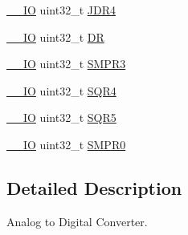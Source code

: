 \begin{DoxyCompactItemize}
\item 
\hyperlink{group___c_m_s_i_s__core__definitions_gaec43007d9998a0a0e01faede4133d6be}{\-\_\-\-\_\-\-I\-O} uint32\-\_\-t \hyperlink{struct_a_d_c___type_def_abae6e9d688b16ef350878998f5e21c0b}{J\-D\-R4}
\item 
\hyperlink{group___c_m_s_i_s__core__definitions_gaec43007d9998a0a0e01faede4133d6be}{\-\_\-\-\_\-\-I\-O} uint32\-\_\-t \hyperlink{struct_a_d_c___type_def_a84114accead82bd11a0e12a429cdfed9}{D\-R}
\item 
\hyperlink{group___c_m_s_i_s__core__definitions_gaec43007d9998a0a0e01faede4133d6be}{\-\_\-\-\_\-\-I\-O} uint32\-\_\-t \hyperlink{struct_a_d_c___type_def_abd2c17178853fe4ec3491bab206042d8}{S\-M\-P\-R3}
\item 
\hyperlink{group___c_m_s_i_s__core__definitions_gaec43007d9998a0a0e01faede4133d6be}{\-\_\-\-\_\-\-I\-O} uint32\-\_\-t \hyperlink{struct_a_d_c___type_def_ab66c9816c1ca151a6ec728ec55655264}{S\-Q\-R4}
\item 
\hyperlink{group___c_m_s_i_s__core__definitions_gaec43007d9998a0a0e01faede4133d6be}{\-\_\-\-\_\-\-I\-O} uint32\-\_\-t \hyperlink{struct_a_d_c___type_def_a9cc66bea4b86f1312a7b34f931c3895a}{S\-Q\-R5}
\item 
\hyperlink{group___c_m_s_i_s__core__definitions_gaec43007d9998a0a0e01faede4133d6be}{\-\_\-\-\_\-\-I\-O} uint32\-\_\-t \hyperlink{struct_a_d_c___type_def_afaad4e722a535b9881668f07b898daa2}{S\-M\-P\-R0}
\end{DoxyCompactItemize}


\subsection{Detailed Description}
Analog to Digital Converter. 

